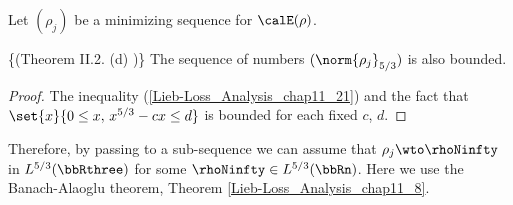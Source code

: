 \documentclass[openany, a4paper, oneside]{jsbook}
\begin{document}
Let $(\rho_j)$ be a minimizing sequence for $\calE (\rho)$.
\begin{lem}\textup\{(Theorem II.2. (d) \cite{LiebSimon1})\}\label{Lieb-Loss_Analysis_chap11_20}
 The sequence of numbers $(\norm{\rho_j}_{5/3})$ is also bounded.
\end{lem}
\begin{proof}
The inequality (\ref{Lieb-Loss_Analysis_chap11_21}) and the fact that $\set{x}{0 \leq x, \, x^{5/3} - cx \leq d}$ is bounded for each fixed $c$, $d$.
\end{proof}

Therefore, by passing to a sub-sequence we can assume that $\rho_j \wto \rhoNinfty$ in $L^{5/3} (\bbRthree)$ for some $\rhoNinfty \in L^{5/3} (\bbRn)$.
Here we use the Banach-Alaoglu theorem, Theorem \ref{Lieb-Loss_Analysis_chap11_8}.
\end{document}
